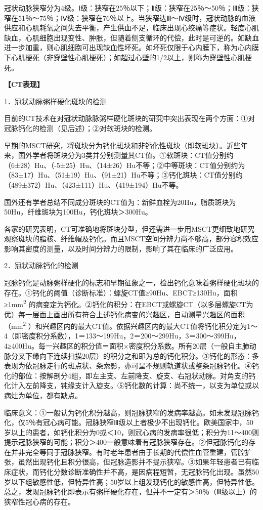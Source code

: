 冠状动脉狭窄分为4级。Ⅰ级：狭窄在25％以下；Ⅱ级：狭窄在25％～50％；Ⅲ级：狭窄在51％～75％；Ⅳ级：狭窄在76％以上。当狭窄达Ⅲ～Ⅳ级时，冠状动脉的血液供应和心肌耗氧之间失去平衡，产生供血不足，临床出现心绞痛等症状。轻度心肌缺血，心肌细胞出现变性、肿胀，但随着侧支循环的代偿，此时是可逆的。如缺血进一步加重，则心肌细胞可出现缺血性坏死。如坏死仅限于心内膜下，称为心内膜下心肌梗死（非穿壁性心肌梗死）；如超过心壁的1/2以上，则称为穿壁性心肌梗死。

\textbf{【CT表现】}

1．冠状动脉粥样硬化斑块的检测

目前的CT技术在对冠状动脉脉粥样硬化斑块的研究中突出表现在两个方面：①对冠脉钙化的检测（见后述）；②对软斑块的检测。

早期的MSCT研究，将斑块分为钙化斑块和非钙化性斑块（即软斑块）。近些年来，国外学者将斑块分为3类并分别测量其CT值。①软斑块：CT值分别约（6±28）Hu、（-5±25）Hu、（14±26）Hu不等；②中等斑块：CT值分别约为（83±17）Hu、（51±19）Hu、（91±21）Hu不等；③钙化斑块：CT值分别约（489±372）Hu、（423±111）Hu、（419±194）Hu不等。

国外还有学者总结不同成分斑块的CT值为：新鲜血栓为20Hu，脂质斑块为50Hu，纤维斑块为100Hu，钙化斑块＞300Hu。

各家的研究表明，CT可准确地将斑块分型，但还需进一步用MSCT更细致地研究观察斑块的脂核、纤维帽及钙化。而且MSCT空间分辨力尚不够高，部分容积效应影响其密度的测量，以及时间分辨力的限制，影响了其在临床的广泛应用。

2．冠状动脉钙化的检测

冠脉钙化是动脉粥样硬化的标志和早期征象之一，检出钙化意味着粥样硬化斑块的存在。①钙化的阈值（诊断标准）：螺旋CT值≥90Hu、EBCT≥130Hu，面积≥1mm\textsuperscript{2}
的病变定为钙化。②钙化的积分：在EBCT或螺旋CT（以多层螺旋CT为优）每一层面上画出所有符合上述钙化病变的兴趣区，自动测量兴趣区的面积（mm\textsuperscript{2}
）和兴趣区内的最大CT值。依据兴趣区内的最大CT值将钙化积分定为1～4（即密度积分系数），1＝133～199Hu，2＝200～299Hu，3＝300～399Hu，4≥400Hu。每一兴趣区的积分值＝面积×密度积分系数。所有20层（一般自主肺动脉分叉下缘向下连续扫描20层）的积分之和即为总的钙化积分。③钙化的形态：多表现为依冠脉走行的斑点状、条索影，亦可呈不规则轨道状或整条冠脉钙化。④钙化的部位：按解剖分4组，即左主支、左前降支、旋支、右冠状动脉。对角支的钙化计入左前降支，钝缘支计入旋支。⑤钙化数的计算：尚不统一，以支为单位或以病灶为单位，都有缺点。

临床意义：①一般认为钙化积分越高，则冠脉狭窄的发病率越高。如未发现冠脉钙化，仅5％有冠心病可能。冠脉狭窄Ⅲ级以上者极少不出现钙化。欧美国家中，50岁以上的患者，如钙化积分为0或＜10，则冠心病的发病率很低；积分为11～400则提示冠脉狭窄的可能；积分＞400一般意味着有冠脉狭窄存在。②但冠脉钙化的存在并非完全等同于冠脉狭窄。有时老年患者由于长期的代偿性血管重建，管腔扩张，虽然出现钙化且积分很高，但冠脉造影并不提示狭窄。③如果年轻患者已有临床症状，而钙化分数诊断准确性并不高，是因病程短暂，无冠脉钙化出现。虽然50岁以下组敏感性低，但特异性高；50岁以上组发现钙化的敏感性高，但特异性低。总之，发现冠脉钙化即表示有粥样硬化存在，但并不一定有＞50％（Ⅲ级以上）的狭窄性冠心病的存在。

